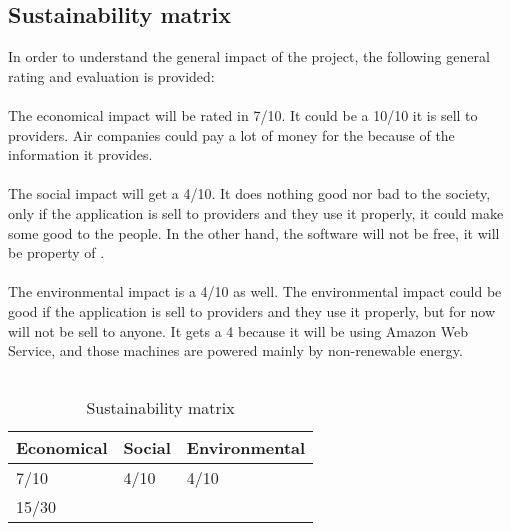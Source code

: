 \subsection{Sustainability matrix}

In order to understand the general impact of the project, the following general rating and evaluation is provided:
\\\\
The economical impact will be rated in 7/10. It could be a 10/10 it is sell to providers. Air companies could pay a lot of money for the \thesis because of the information it provides.
\\\\
The social impact will get a 4/10. It does nothing good nor bad to the society, only if the application is sell to providers and they use it properly, it could make some good to the people. In the other hand, the software will not be free, it will be property of \company.
\\\\
The environmental impact is a 4/10 as well. The environmental impact could be good if the application is sell to providers and they use it properly, but for now will not be sell to anyone. It gets a 4 because it will be using Amazon Web Service, and those machines are powered mainly by non-renewable energy\cite{click_clean}.
\\\\

\begin{table}[H]
\centering
\begin{tabular}{|l|l|l|}
\hline
Economical & Social & Environmental \\ \hline
7/10       & 4/10   & 4/10          \\ \hline
\multicolumn{3}{|l|}{15/30}         \\ \hline
\end{tabular}
\caption{Sustainability matrix}
\label{sustainability-matrix}
\end{table}

